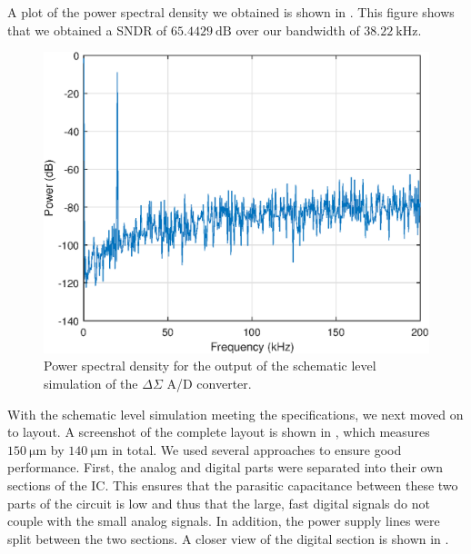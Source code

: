 \documentclass[journal,hidelinks]{IEEEtran}
\begin{document}
A plot of the power spectral density we obtained is shown in . This figure shows that we obtained a SNDR of $\SI{65.4429}{\deci\bel}$ over our bandwidth of $\SI{38.22}{\kilo\hertz}$.

\begin{figure}[!htb]
  \centering
  \includegraphics[width=0.8\columnwidth]{circuit/schematic_psd.eps}
  \caption{Power spectral density for the output of the schematic level simulation of the $\Delta \Sigma$ A/D converter.}
  \label{fig:schematic_psd}
\end{figure}

With the schematic level simulation meeting the specifications, we next moved on to layout. A screenshot of the complete layout is shown in , which measures $\SI{150}{\micro\meter}$ by $\SI{140}{\micro\meter}$ in total. We used several approaches to ensure good performance. First, the analog and digital parts were separated into their own sections of the IC. This ensures that the parasitic capacitance between these two parts of the circuit is low and thus that the large, fast digital signals do not couple with the small analog signals. In addition, the power supply lines were split between the two sections. A closer view of the digital section is shown in .
\end{document}

